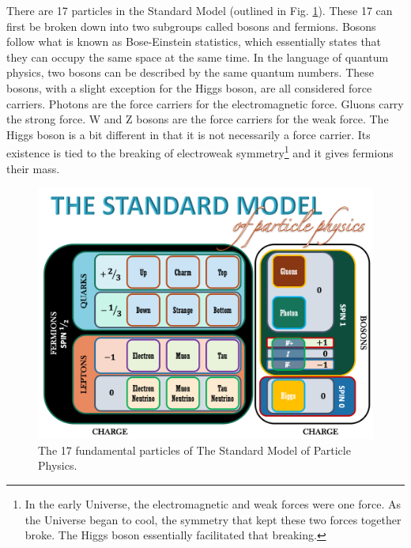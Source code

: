 There are 17 particles in the Standard Model (outlined in Fig. \ref{fig:standard_model}). These 17 can first be broken down into two subgroups called bosons and fermions. Bosons follow what is known as Bose-Einstein statistics, which essentially states that they can occupy the same space at the same time. In the language of quantum physics, two bosons can be described by the same quantum numbers. These bosons, with a slight exception for the Higgs boson, are all considered force carriers. Photons are the force carriers for the electromagnetic force. Gluons carry the strong force. W and Z bosons are the force carriers for the weak force. The Higgs boson is a bit different in that it is not necessarily a force carrier. Its existence is tied to the breaking of electroweak symmetry\footnote{In the early Universe, the electromagnetic and weak forces were one force. As the Universe began to cool, the symmetry that kept these two forces together broke. The Higgs boson essentially facilitated that breaking.} and it gives fermions their mass.

\begin{figure}[h!]
	\centering
	\includegraphics[width=0.99\linewidth]{figures/standard_model.png}
	\caption{The 17 fundamental particles of The Standard Model of Particle Physics.}
	\label{fig:standard_model}
\end{figure}

